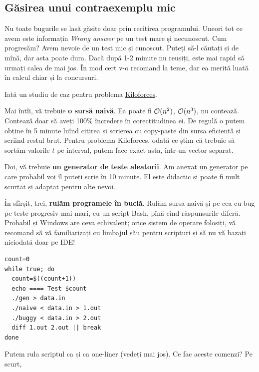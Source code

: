 \documentclass[../main.tex]{subfiles}
\begin{document}
\subsection{Găsirea unui contraexemplu mic}

Nu toate bugurile se lasă găsite doar prin recitirea programului. Uneori tot ce avem este informația \textit{Wrong answer} pe un test mare și necunoscut. Cum progresăm? Avem nevoie de un test mic și cunoscut. Puteți să-l căutați și de mînă, dar asta poate dura. Dacă după 1-2 minute nu reușiți, este mai rapid să urmați calea de mai jos. În mod cert v-o recomand la teme, dar ea merită luată în calcul chiar și la concursuri.

Iată un studiu de caz pentru problema \href{https://kilonova.ro/problems/2021}{Kiloforces}.

Mai întîi, vă trebuie \textbf{o sursă naivă}. Ea poate fi $\mathcal{O}(n^2)$, $\mathcal{O}(n^3)$, nu contează. Contează doar să aveți 100\% încredere în corectitudinea ei. De regulă o putem obține în 5 minute luînd citirea și scrierea cu copy-paste din sursa eficientă și scriind restul brut. Pentru problema Kiloforces, odată ce știm că trebuie să sortăm valorile $t$ pe interval, putem face exact asta, într-un vector separat.

\label{problem:principles-generator}

Doi, vă trebuie \textbf{un generator de teste aleatorii}. Am anexat \hyperref[code:principles-generator]{un generator} pe care probabil voi îl puteți scrie în 10 minute. El este didactic și poate fi mult scurtat și adaptat pentru alte nevoi.

În sfîrșit, trei, \textbf{rulăm programele în buclă}. Rulăm sursa naivă și pe cea cu bug pe teste progresiv mai mari, cu un script Bash, pînă cînd răspunsurile diferă. Probabil și Windows are ceva echivalent; orice sistem de operare folosiți, vă recomand să vă familiarizați cu limbajul său pentru scripturi și să nu vă bazați niciodată doar pe IDE!

\begin{verbatim}
count=0
while true; do
  count=$((count+1))
  echo ==== Test $count
  ./gen > data.in
  ./naive < data.in > 1.out
  ./buggy < data.in > 2.out
  diff 1.out 2.out || break
done
\end{verbatim}

Putem rula scriptul ca și ca one-liner (vedeți mai jos). Ce fac aceste comenzi? Pe scurt,
\end{document}

